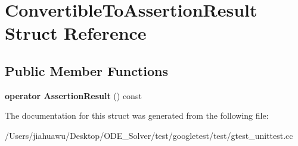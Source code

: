 \hypertarget{struct_convertible_to_assertion_result}{}\section{Convertible\+To\+Assertion\+Result Struct Reference}
\label{struct_convertible_to_assertion_result}
\subsection*{Public Member Functions}
\begin{DoxyCompactItemize}
\item 
\mbox{\label{struct_convertible_to_assertion_result_a0f816f2f25ecaf29a95b3cfd4033e105}} 
{\bfseries operator Assertion\+Result} () const
\end{DoxyCompactItemize}


The documentation for this struct was generated from the following file\+:\begin{DoxyCompactItemize}
\item 
/\+Users/jiahuawu/\+Desktop/\+O\+D\+E\+\_\+\+Solver/test/googletest/test/gtest\+\_\+unittest.\+cc\end{DoxyCompactItemize}
